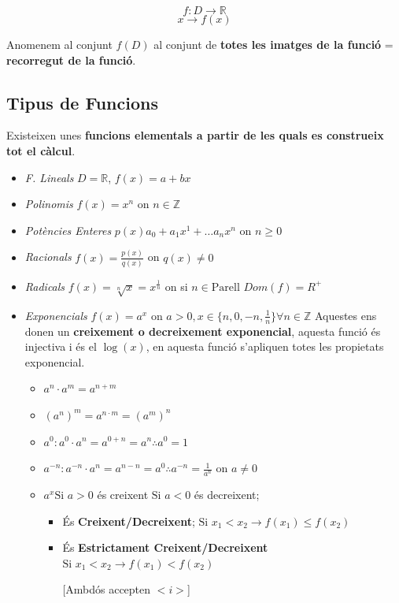\documentclass[12pt]{article}
\newcommand{\R}{\mathbb{R}}
\newcommand{\Z}{\mathbb{Z}}
\begin{document}
\[f: D \rightarrow \R\]
\[x \rightarrow f(x)\]

Anomenem al conjunt $f(D)$ al conjunt de \textbf{totes les imatges de la funció} = \textbf{recorregut de la funció}.
\subsection{Tipus de Funcions}

Existeixen unes \textbf{funcions elementals a partir de les quals es construeix tot el càlcul}.

\begin{itemize}
    \item \textit{F. Lineals} $D = \R$, $f(x) = a+bx$
    \item \textit{Polinomis} $f(x) = x^n$ on $n \in \Z$
    \item \textit{Potències Enteres} $p(x) a_0 + a_1x^1 + \dots a_nx^n$ on $n\geq 0$
    \item \textit{Racionals} $f(x) = \frac{p(x)}{q(x)}$ on $q(x) \neq 0$
    \item \textit{Radicals} $f(x) = \sqrt[n]{x} = x^{\frac{1}{n}}$ on si $n \in \text{Parell } Dom(f) = R^+$
    \item \textit{Exponencials} $f(x) = a^x$ on $a > 0, x\in\{n,0,-n,\frac{1}{n}\} \forall n \in \Z$
    Aquestes ens donen un \textbf{creixement o decreixement exponencial}, aquesta funció és injectiva i és el $\log(x)$, en aquesta funció s'apliquen totes les propietats exponencial.
    \begin{itemize}
        \item $a^n \cdot a^m = a^{n + m}$
        \item $(a^n)^m = a^{n\cdot m} = (a^m)^n$
        \item $a^0: a^0 \cdot a^n = a^{0+n} = a^n \therefore a^0 = 1$
        \item $a^{-n}: a^{-n} \cdot a^n = a^{n-n} = a^0 \therefore a^{-n} = \frac{1}{a^n}$ on $a\neq 0$
        \item $a^x \text{Si } a > 0$ és creixent $\text{Si } a<0$ és decreixent;
        \begin{itemize}
            \item És \textbf{Creixent/Decreixent};
            $\text{Si } x_1 < x_2 \rightarrow f(x_1) \leq f(x_2)$
            \item És \textbf{Estrictament Creixent/Decreixent}
            $\text{Si } x_1 < x_2 \rightarrow f(x_1) < f(x_2)$

            [Ambdós accepten $< i >$]
        \end{itemize}
    \end{itemize} 
\end{itemize}
\end{document}

